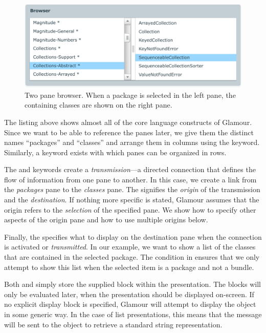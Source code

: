 \documentclass[a4paper,10pt,twoside]{book}
\begin{document}
\begin{figure}[htbp]
\centerline{\includegraphics[width=\linewidth]{showclasses.pdf}}
\caption{Two pane browser. When a package is selected in the left
  pane, the containing classes are shown on the right pane.}
\label{fig:showclasses}
\end{figure}

The listing above shows almost all of the core language constructs of
Glamour. Since we want to be able to reference the panes later, we
give them the distinct names ``packages'' and ``classes'' and arrange them
in columns using the  keyword. Similarly, a 
keyword exists with which panes can be organized in rows.

The  and  keywords create a \emph{transmission}---a directed connection that defines the flow of information from one pane to another. In this case, we create a link from the \emph{packages} pane to the \emph{classes} pane. The  signifies the \emph{origin} of the transmission and  the \emph{destination}. If nothing more specific is stated, Glamour assumes that the origin refers to the \emph{selection} of the specified pane. We show how to specify other aspects of the origin pane and how to use multiple origins below.

Finally, the  specifies what to display on the destination pane when the connection is activated or \emph{transmitted}. In our example, we want to show a list of the classes that are contained in the selected package. The condition in  ensures that we only attempt to show this list when the selected item is a package and not a bundle.

Both  and  simply store the supplied block within the presentation. The blocks will only be evaluated later, when the presentation should be displayed on-screen. If no explicit display block is specified, Glamour will attempt to display the object in some generic way. In the case of list presentations, this means that the  message will be sent to the object to retrieve a standard string representation.
\end{document}

